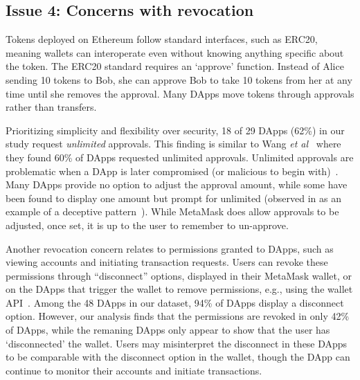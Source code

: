 \documentclass[conference]{IEEEtran}
\begin{document}

\subsection{Issue 4: Concerns with revocation}
Tokens deployed on Ethereum follow standard interfaces, such as ERC20, meaning wallets can interoperate even without knowing anything specific about the token.
The ERC20 standard requires an `approve' function. Instead of Alice sending 10 tokens to Bob, she can approve Bob to take 10 tokens from her at any time until she removes the approval. 
Many DApps move tokens through approvals rather than transfers.

Prioritizing simplicity and flexibility over security, 18 of 29 DApps (62\%) in our study request \textit{unlimited} approvals. %
This finding is similar to Wang \textit{et al}~\cite{wang2022penny} where they found 60\% of DApps requested unlimited approvals.
Unlimited approvals are problematic when a DApp is later compromised (or malicious to begin with)~\cite{incident2020Bancor,incident2021Primitive}.
Many DApps provide no option to adjust the approval amount, while some have been found to display one amount but prompt for unlimited (observed in \cite{wang2022penny} as an example of a deceptive pattern~\cite{mathur2019dark}). While MetaMask does allow approvals to be adjusted, once set, it is up to the user to remember to un-approve.  

Another revocation concern relates to permissions granted to DApps, such as viewing accounts and initiating transaction requests. 
Users can revoke these permissions through ``disconnect'' options, displayed in their MetaMask wallet, or on the DApps that trigger the wallet to remove permissions, e.g., using the wallet API~\cite{metamaskRevokePermissions}.
Among the 48 DApps in our dataset, 94\% of DApps display a disconnect option.
However, our analysis finds that the permissions are revoked in only 42\% of DApps, while the remaning DApps only appear to show that the user has `disconnected' the wallet.
Users may misinterpret the disconnect in these DApps to be comparable with the disconnect option in the wallet, though the DApp can continue to monitor their accounts and initiate transactions. 
\end{document}
